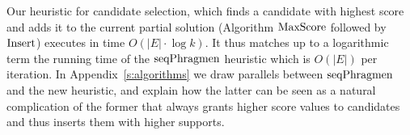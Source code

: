 Our heuristic for candidate selection, which finds a candidate with highest score and adds it to the current partial solution (Algorithm $\operatorname{MaxScore}$ followed by $\operatorname{Insert}$) executes in time $O(|E|\cdot \log k)$. 
It thus matches up to a logarithmic term the running time of the $\operatorname{seqPhragmen}$ heuristic which is $O(|E|)$ per iteration. 
In Appendix~\ref{s:algorithms} we draw parallels between $\operatorname{seqPhragmen}$ and the new heuristic, and explain how the latter can be seen as a natural complication of the former that always grants higher score values to candidates and thus inserts them with higher supports.

